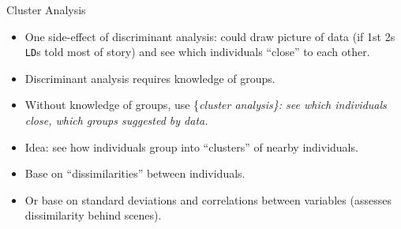 \documentclass[ignorenonframetext,]{beamer}
\begin{document}
\begin{frame}[fragile]{Cluster Analysis}
\protect\hypertarget{cluster-analysis}{}

\begin{itemize}
\item
  One side-effect of discriminant analysis: could draw picture of data
  (if 1st 2s \texttt{LD}s told most of story) and see which individuals
  ``close'' to each other.
\item
  Discriminant analysis requires knowledge of groups.
\item
  Without knowledge of groups, use \{\em cluster analysis\}: see which
  individuals close, which groups suggested by data.
\item
  Idea: see how individuals group into ``clusters'' of nearby
  individuals.
\item
  Base on ``dissimilarities'' between individuals.
\item
  Or base on standard deviations and correlations between variables
  (assesses dissimilarity behind scenes).
\end{itemize}

\end{frame}
\end{document}
